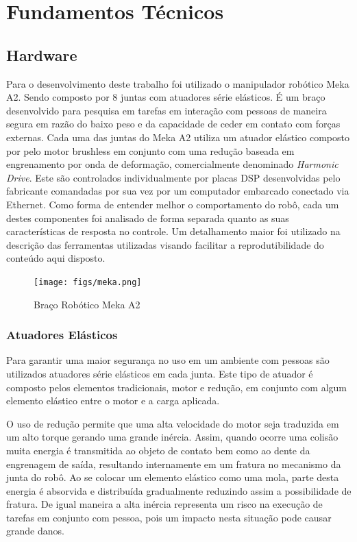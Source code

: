 \chapter{Fundamentos Técnicos}\label{ch:tech-reference}

\section{Hardware}

Para o desenvolvimento deste trabalho foi utilizado o manipulador robótico Meka A2. Sendo composto por 8 juntas com atuadores série elásticos. É um braço desenvolvido para pesquisa em tarefas em interação com pessoas de maneira segura em razão do baixo peso e da capacidade de ceder em contato com forças externas. 
Cada uma das juntas do Meka A2 utiliza um atuador elástico composto por pelo motor brushless em conjunto com uma redução baseada em engrenamento por onda de deformação, comercialmente denominado \textit{Harmonic Drive}. Este são controlados individualmente por placas DSP desenvolvidas pelo fabricante comandadas por sua vez por um computador embarcado conectado via Ethernet. Como forma de entender melhor o comportamento do robô, cada um destes componentes foi analisado de forma separada quanto as suas características de resposta no controle. Um detalhamento maior foi utilizado na descrição das ferramentas utilizadas visando facilitar a reprodutibilidade do conteúdo aqui disposto.

\begin{figure}[H]
    \centering
    \texttt{[image: figs/meka.png]}
    \caption{Braço Robótico Meka A2}
    \label{fig:meka_arm}
\end{figure}

\subsection{Atuadores Elásticos}

Para garantir uma maior segurança no uso em um ambiente com pessoas são utilizados atuadores série elásticos em cada junta. Este tipo de atuador é composto pelos elementos tradicionais, motor e redução, em conjunto com algum elemento elástico entre o motor e a carga aplicada. %


O uso de redução permite que uma alta velocidade do motor seja traduzida em um alto torque gerando uma grande inércia. Assim, quando ocorre uma colisão muita energia é transmitida ao objeto de contato bem como ao dente da engrenagem de saída, resultando internamente em um fratura no mecanismo da junta do robô. Ao se colocar um elemento elástico como uma mola, parte desta energia é absorvida e distribuída gradualmente reduzindo assim a possibilidade de fratura. De igual maneira a alta inércia representa um risco na execução de tarefas em conjunto com pessoa, pois um impacto nesta situação pode causar grande danos.

